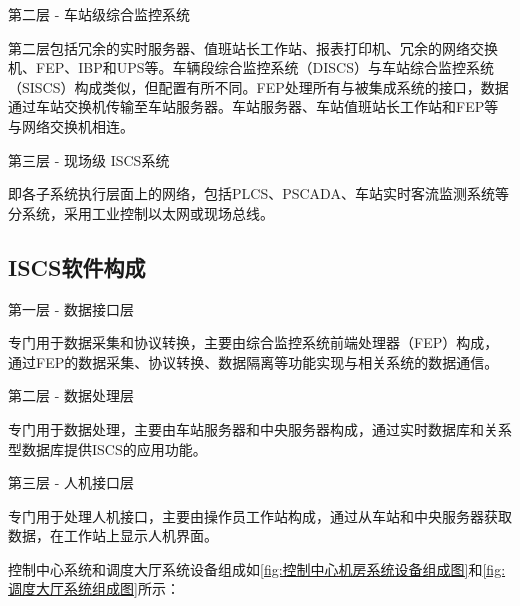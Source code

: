 第二层 - 车站级综合监控系统

第二层包括冗余的实时服务器、值班站长工作站、报表打印机、冗余的网络交换机、FEP、IBP和UPS等。车辆段综合监控系统（DISCS）与车站综合监控系统（SISCS）构成类似，但配置有所不同。FEP处理所有与被集成系统的接口，数据通过车站交换机传输至车站服务器。车站服务器、车站值班站长工作站和FEP等与网络交换机相连。

第三层 - 现场级 ISCS系统

即各子系统执行层面上的网络，包括PLCS、PSCADA、车站实时客流监测系统等分系统，采用工业控制以太网或现场总线。

\subsection{ISCS软件构成}
第一层 - 数据接口层

专门用于数据采集和协议转换，主要由综合监控系统前端处理器（FEP）构成，通过FEP的数据采集、协议转换、数据隔离等功能实现与相关系统的数据通信。

第二层 - 数据处理层

专门用于数据处理，主要由车站服务器和中央服务器构成，通过实时数据库和关系型数据库提供ISCS的应用功能。

第三层 - 人机接口层

专门用于处理人机接口，主要由操作员工作站构成，通过从车站和中央服务器获取数据，在工作站上显示人机界面。

控制中心系统和调度大厅系统设备组成如\ref{fig:控制中心机房系统设备组成图}和\ref{fig:调度大厅系统组成图}所示：

